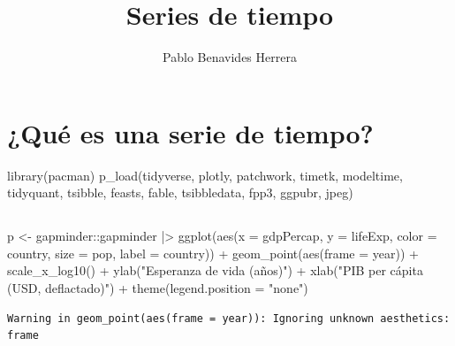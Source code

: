 \documentclass[
  letterpaper,
  DIV=11,
  numbers=noendperiod]{scrartcl}
\title{Series de tiempo}
\author{Pablo Benavides Herrera}
\date{}
\newenvironment{Shaded}{}{}
\newcommand{\AttributeTok}[1]{\textcolor[rgb]{0.65,0.15,0.64}{#1}}
\newcommand{\FunctionTok}[1]{\textcolor[rgb]{0.25,0.47,0.95}{#1}}
\newcommand{\NormalTok}[1]{\textcolor[rgb]{0.22,0.23,0.26}{#1}}
\newcommand{\OtherTok}[1]{\textcolor[rgb]{0.15,0.68,0.38}{#1}}
\newcommand{\SpecialCharTok}[1]{\textcolor[rgb]{0.00,0.52,0.74}{#1}}
\newcommand{\StringTok}[1]{\textcolor[rgb]{0.31,0.63,0.31}{#1}}
\renewcommand*\contentsname{Table of contents}
\newcommand\contentsname{Table of contents}
\begin{document}
\maketitle

\renewcommand*\contentsname{Table of contents}
{
\hypersetup{linkcolor=}
\setcounter{tocdepth}{3}
\tableofcontents
}
\section{¿Qué es una serie de
tiempo?}\label{quuxe9-es-una-serie-de-tiempo}

\begin{Shaded}
\begin{Highlighting}[]
\FunctionTok{library}\NormalTok{(pacman)}
\FunctionTok{p\_load}\NormalTok{(tidyverse, plotly, patchwork, timetk, modeltime, tidyquant, tsibble, feasts, fable, tsibbledata, fpp3, ggpubr, jpeg)}
\end{Highlighting}
\end{Shaded}

\subsection{}\label{section}

\begin{Shaded}
\begin{Highlighting}[]
\NormalTok{p }\OtherTok{\textless{}{-}}\NormalTok{ gapminder}\SpecialCharTok{::}\NormalTok{gapminder }\SpecialCharTok{|\textgreater{}} 
  \FunctionTok{ggplot}\NormalTok{(}\FunctionTok{aes}\NormalTok{(}\AttributeTok{x =}\NormalTok{ gdpPercap, }\AttributeTok{y =}\NormalTok{ lifeExp, }\AttributeTok{color =}\NormalTok{ country,}
                       \AttributeTok{size =}\NormalTok{ pop, }\AttributeTok{label =}\NormalTok{ country)) }\SpecialCharTok{+}
  \FunctionTok{geom\_point}\NormalTok{(}\FunctionTok{aes}\NormalTok{(}\AttributeTok{frame =}\NormalTok{ year)) }\SpecialCharTok{+} 
  \FunctionTok{scale\_x\_log10}\NormalTok{() }\SpecialCharTok{+} 
  \FunctionTok{ylab}\NormalTok{(}\StringTok{"Esperanza de vida (años)"}\NormalTok{) }\SpecialCharTok{+}
  \FunctionTok{xlab}\NormalTok{(}\StringTok{"PIB per cápita (USD, deflactado)"}\NormalTok{) }\SpecialCharTok{+}
  \FunctionTok{theme}\NormalTok{(}\AttributeTok{legend.position =} \StringTok{"none"}\NormalTok{)}
\end{Highlighting}
\end{Shaded}

\begin{verbatim}
Warning in geom_point(aes(frame = year)): Ignoring unknown aesthetics: frame
\end{verbatim}
\end{document}
